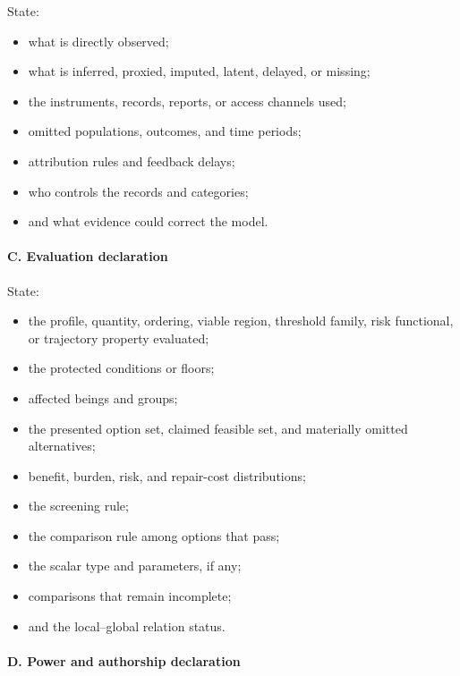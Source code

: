 \documentclass[
  11pt,
]{article}
\providecommand{\tightlist}{%
  \setlength{\itemsep}{0pt}\setlength{\parskip}{0pt}}
\begin{document}
State:

\begin{itemize}
\tightlist
\item
  what is directly observed;
\item
  what is inferred, proxied, imputed, latent, delayed, or missing;
\item
  the instruments, records, reports, or access channels used;
\item
  omitted populations, outcomes, and time periods;
\item
  attribution rules and feedback delays;
\item
  who controls the records and categories;
\item
  and what evidence could correct the model.
\end{itemize}

\paragraph{C. Evaluation declaration}\label{c.-evaluation-declaration}

State:

\begin{itemize}
\tightlist
\item
  the profile, quantity, ordering, viable region, threshold family, risk
  functional, or trajectory property evaluated;
\item
  the protected conditions or floors;
\item
  affected beings and groups;
\item
  the presented option set, claimed feasible set, and materially omitted
  alternatives;
\item
  benefit, burden, risk, and repair-cost distributions;
\item
  the screening rule;
\item
  the comparison rule among options that pass;
\item
  the scalar type and parameters, if any;
\item
  comparisons that remain incomplete;
\item
  and the local--global relation status.
\end{itemize}

\paragraph{D. Power and authorship
declaration}\label{d.-power-and-authorship-declaration}
\end{document}
